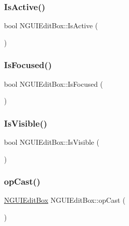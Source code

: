 \hypertarget{class_n_g_u_i_edit_box_a2e9615371f6e892074d25ae5742c95d1}{}\label{class_n_g_u_i_edit_box_a2e9615371f6e892074d25ae5742c95d1} 
\subsubsection{\texorpdfstring{Is\+Active()}{IsActive()}}
{\footnotesize\ttfamily bool N\+G\+U\+I\+Edit\+Box\+::\+Is\+Active (\begin{DoxyParamCaption}{ }\end{DoxyParamCaption})}

\hypertarget{class_n_g_u_i_edit_box_a7b40d9a94b30a4bdc5859c19e465ef13}{}\label{class_n_g_u_i_edit_box_a7b40d9a94b30a4bdc5859c19e465ef13} 
\subsubsection{\texorpdfstring{Is\+Focused()}{IsFocused()}}
{\footnotesize\ttfamily bool N\+G\+U\+I\+Edit\+Box\+::\+Is\+Focused (\begin{DoxyParamCaption}{ }\end{DoxyParamCaption})}

\hypertarget{class_n_g_u_i_edit_box_a33af063591321cabb4e8ea681209e0b5}{}\label{class_n_g_u_i_edit_box_a33af063591321cabb4e8ea681209e0b5} 
\subsubsection{\texorpdfstring{Is\+Visible()}{IsVisible()}}
{\footnotesize\ttfamily bool N\+G\+U\+I\+Edit\+Box\+::\+Is\+Visible (\begin{DoxyParamCaption}{ }\end{DoxyParamCaption})}

\hypertarget{class_n_g_u_i_edit_box_a8460ddecf39424726382bd14aae39b4f}{}\label{class_n_g_u_i_edit_box_a8460ddecf39424726382bd14aae39b4f} 
\subsubsection{\texorpdfstring{op\+Cast()}{opCast()}}
{\footnotesize\ttfamily \hyperlink{class_n_g_u_i_edit_box}{N\+G\+U\+I\+Edit\+Box} N\+G\+U\+I\+Edit\+Box\+::op\+Cast (\begin{DoxyParamCaption}{ }\end{DoxyParamCaption})}

